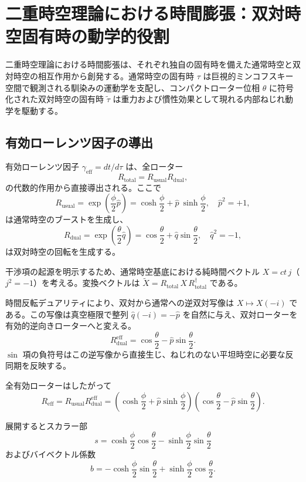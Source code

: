 \documentclass[dvipdfmx,a4paper]{article}
\begin{document}
\section{二重時空理論における時間膨張：双対時空固有時の動学的役割}
\label{sec:timedilation}

二重時空理論における時間膨張は、それぞれ独自の固有時を備えた通常時空と双対時空の相互作用から創発する。通常時空の固有時 $\tau$ は巨視的ミンコフスキー空間で観測される馴染みの運動学を支配し、コンパクトローター位相 $\theta$ に符号化された双対時空の固有時 $\tilde{\tau}$ は重力および慣性効果として現れる内部ねじれ動学を駆動する。

\subsection{有効ローレンツ因子の導出}

有効ローレンツ因子 $\gamma_\text{eff} = dt/d\tau$ は、全ローター
\[
R_\text{total} = R_\text{usual} R_\text{dual},
\]
の代数的作用から直接導出される。ここで
\[
R_\text{usual} = \exp\!\left(\frac{\phi}{2} \hat{p}\right) = \cosh\frac{\phi}{2} + \hat{p}\: \sinh\frac{\phi}{2}, \quad \hat{p}^2 = +1,
\]
は通常時空のブーストを生成し、
\[
R_\text{dual} = \exp\!\left(\frac{\theta}{2} \hat{q}\right) = \cos\frac{\theta}{2} + \hat{q} \sin\frac{\theta}{2}, \quad \hat{q}^2 = -1,
\]
は双対時空の回転を生成する。

干渉項の起源を明示するため、通常時空基底における純時間ベクトル $X = ct \, j$（$j^2 = -1$）を考える。変換ベクトルは $\tilde{X} = R_\text{total} \, X \, R_\text{total}^\dagger$ である。

時間反転デュアリティにより、双対から通常への逆双対写像は $X \mapsto X(-i)$ である。この写像は真空極限で整列 $\hat{q} (-i) = -\hat{p}$ を自然に与え、双対ローターを有効的逆向きローターへと変える。
\[
R_\text{dual}^\text{eff} = \cos\frac{\theta}{2} - \hat{p} \sin\frac{\theta}{2}.
\]
$\sin$ 項の負符号はこの逆写像から直接生じ、ねじれのない平坦時空に必要な反同期を反映する。

全有効ローターはしたがって
\[
R_\text{eff} = R_\text{usual} R_\text{dual}^\text{eff} = \left( \cosh\frac{\phi}{2} + \hat{p} \sinh\frac{\phi}{2} \right) \left( \cos\frac{\theta}{2} - \hat{p} \sin\frac{\theta}{2} \right).
\]

展開するとスカラー部
\[
s = \cosh\frac{\phi}{2} \cos\frac{\theta}{2} - \sinh\frac{\phi}{2} \sin\frac{\theta}{2}
\]
およびバイベクトル係数
\[
b = -\cosh\frac{\phi}{2} \sin\frac{\theta}{2} + \sinh\frac{\phi}{2} \cos\frac{\theta}{2}.
\]
\end{document}
